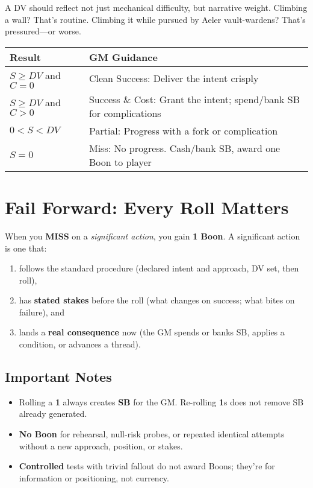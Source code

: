A DV should reflect not just mechanical difficulty, but narrative weight. Climbing a wall? That's routine. Climbing it while pursued by Aeler vault-wardens? That's pressured---or worse.

\begin{fatebox}
\begin{tabularx}{\textwidth}{lX}
\toprule
\textbf{Result} & \textbf{GM Guidance} \\
\midrule
$S \geq DV$ and $C = 0$ & Clean Success: Deliver the intent crisply \\
$S \geq DV$ and $C > 0$ & Success \& Cost: Grant the intent; spend/bank SB for complications \\
$0 < S < DV$ & Partial: Progress with a fork or complication \\
$S = 0$ & Miss: No progress. Cash/bank SB, award one Boon to player \\
\bottomrule
\end{tabularx}
\end{fatebox}

\section{Fail Forward: Every Roll Matters}

When you \textbf{MISS} on a \emph{significant action}, you gain \textbf{1 Boon}. A significant action is one that:
\begin{enumerate}
  \item follows the standard procedure (declared intent and approach, DV set, then roll), 
  \item has \textbf{stated stakes} before the roll (what changes on success; what bites on failure), and
  \item lands a \textbf{real consequence} now (the GM spends or banks SB, applies a condition, or advances a thread).
\end{enumerate}

\subsection{Important Notes}
\begin{itemize}
  \item Rolling a \textbf{1} always creates \textbf{SB} for the GM. Re-rolling \textbf{1}s does not remove SB already generated.
  \item \textbf{No Boon} for rehearsal, null-risk probes, or repeated identical attempts without a new approach, position, or stakes.
  \item \textbf{Controlled} tests with trivial fallout do not award Boons; they're for information or positioning, not currency.
\end{itemize}

